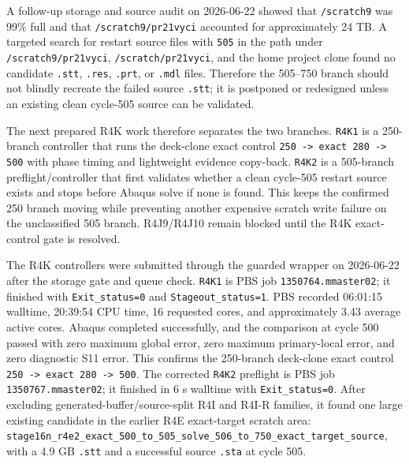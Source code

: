 \documentclass[11pt,a4paper]{article}
\newcommand{\code}[1]{\texttt{#1}}
\begin{document}
A follow-up storage and source audit on 2026-06-22 showed that \code{/scratch9} was 99\% full and that \code{/scratch9/pr21vyci} accounted for approximately 24 TB. A targeted search for restart source files with \code{505} in the path under \code{/scratch9/pr21vyci}, \code{/scratch/pr21vyci}, and the home project clone found no candidate \code{.stt}, \code{.res}, \code{.prt}, or \code{.mdl} files. Therefore the 505--750 branch should not blindly recreate the failed source \code{.stt}; it is postponed or redesigned unless an existing clean cycle-505 source can be validated.

The next prepared R4K work therefore separates the two branches. \code{R4K1} is a 250-branch controller that runs the deck-clone exact control \code{250 -> exact 280 -> 500} with phase timing and lightweight evidence copy-back. \code{R4K2} is a 505-branch preflight/controller that first validates whether a clean cycle-505 restart source exists and stops before Abaqus solve if none is found. This keeps the confirmed 250 branch moving while preventing another expensive scratch write failure on the unclassified 505 branch. R4J9/R4J10 remain blocked until the R4K exact-control gate is resolved.

The R4K controllers were submitted through the guarded wrapper on 2026-06-22 after the storage gate and queue check. \code{R4K1} is PBS job \code{1350764.mmaster02}; it finished with \code{Exit\_status=0} and \code{Stageout\_status=1}. PBS recorded 06:01:15 walltime, 20:39:54 CPU time, 16 requested cores, and approximately 3.43 average active cores. Abaqus completed successfully, and the comparison at cycle 500 passed with zero maximum global error, zero maximum primary-local error, and zero diagnostic S11 error. This confirms the 250-branch deck-clone exact control \code{250 -> exact 280 -> 500}. The corrected \code{R4K2} preflight is PBS job \code{1350767.mmaster02}; it finished in 6 s walltime with \code{Exit\_status=0}. After excluding generated-buffer/source-split R4I and R4I-R families, it found one large existing candidate in the earlier R4E exact-target scratch area: \code{stage16n\_r4e2\_exact\_500\_to\_505\_solve\_506\_to\_750\_exact\_target\_source}, with a 4.9 GB \code{.stt} and a successful source \code{.sta} at cycle 505.
\end{document}
